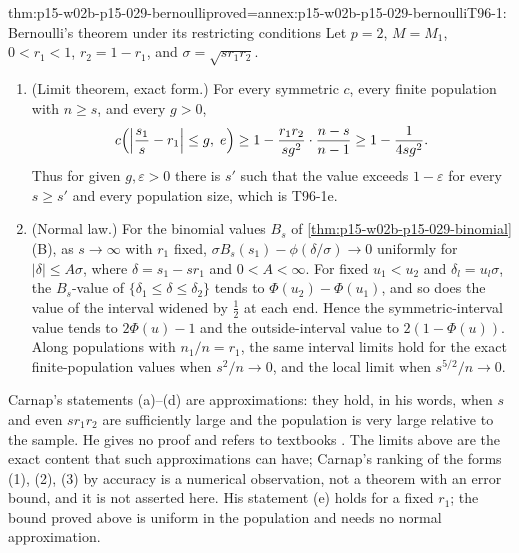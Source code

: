 \begin{hbtheorem}{thm:p15-w02b-p15-029-bernoulli}{proved=annex:p15-w02b-p15-029-bernoulli}{T96-1: Bernoulli's theorem under its restricting conditions}
Let \(p=2\), \(M=M_1\), \(0<r_1<1\), \(r_2=1-r_1\), and
\(\sigma=\sqrt{sr_1r_2}\).
\begin{enumerate}
 \item[(e)] (Limit theorem, exact form.) For every symmetric \(c\),
       every finite population with \(n\geq s\), and every \(g>0\),
       \[
        c\Bigl(\Bigl|\frac{s_1}s-r_1\Bigr|\leq g,\;e\Bigr)
        \geq1-\frac{r_1r_2}{sg^2}\cdot\frac{n-s}{n-1}
        \geq1-\frac1{4sg^2}.
       \]
       Thus for given \(g,\varepsilon>0\) there is \(s'\) such that the
       value exceeds \(1-\varepsilon\) for every \(s\geq s'\) and every
       population size, which is T96-1e.
 \item[(a)--(d)] (Normal law.) For the binomial values \(B_s\) of
       \cref{thm:p15-w02b-p15-029-binomial}(B), as \(s\to\infty\) with
       \(r_1\) fixed, \(\sigma B_s(s_1)-\phi(\delta/\sigma)\to0\)
       uniformly for \(|\delta|\leq A\sigma\), where
       \(\delta=s_1-sr_1\) and \(0<A<\infty\). For fixed
       \(u_1<u_2\) and \(\delta_l=u_l\sigma\), the \(B_s\)-value of
       \(\{\delta_1\leq\delta\leq\delta_2\}\) tends to
       \(\Phi(u_2)-\Phi(u_1)\), and so does the value of the interval
       widened by \(\tfrac12\) at each end. Hence the symmetric-interval
       value tends to \(2\Phi(u)-1\) and the outside-interval value to
       \(2(1-\Phi(u))\). Along populations with \(n_1/n=r_1\), the
       same interval limits hold for the exact finite-population values
       when \(s^2/n\to0\), and the local limit when
       \(s^{5/2}/n\to0\).
\end{enumerate}
\end{hbtheorem}

Carnap's statements (a)--(d) are approximations: they hold, in his
words, when \(s\) and even \(sr_1r_2\) are sufficiently large and the
population is very large relative to the sample. He gives no proof and
refers to textbooks \cite[sec.~96, pp.~503--505]{Carnap1950Probability}.
The limits above are the exact content that such approximations can
have; Carnap's ranking of the forms (1), (2), (3) by accuracy is a
numerical observation, not a theorem with an error bound, and it is not
asserted here. His statement (e) holds for a fixed \(r_1\); the bound
proved above is uniform in the population and needs no normal
approximation.

